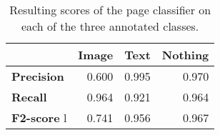 \begin{table}[h]
\centering
\begin{tabular}{l r r r}
\hline
  & \textbf{Image} & \textbf{Text} & \textbf{Nothing} \\\hline
\textbf{Precision} & 0.600  & 0.995 & 0.970 \\
\textbf{Recall}    & 0.964  & 0.921 & 0.964 \\
\textbf{F2-score} l& 0.741  & 0.956 & 0.967 \\\hline
\end{tabular}
\caption{Resulting scores of the page classifier on each of the three annotated
classes.}
\label{tab:pageclasresults}
\end{table}

